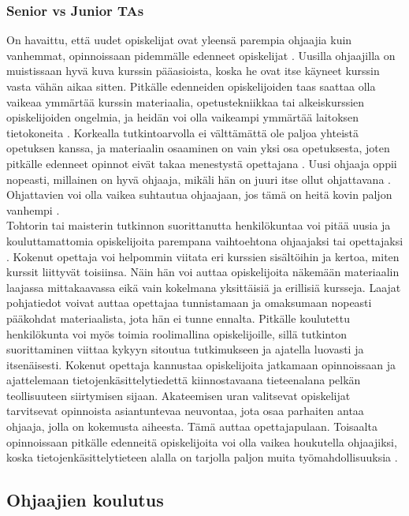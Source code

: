 \documentclass[finnish]{tktltiki2}
\theoremstyle{definition}
\theoremstyle{remark}
\begin{document}
\subsubsection{Senior vs Junior TAs}
On havaittu, että uudet opiskelijat ovat yleensä parempia ohjaajia kuin vanhemmat, opinnoissaan pidemmälle edenneet opiskelijat \cite{Dickson11}. Uusilla ohjaajilla on muistissaan hyvä kuva kurssin pääasioista, koska he ovat itse käyneet kurssin vasta vähän aikaa sitten. Pitkälle edenneiden opiskelijoiden taas saattaa olla vaikeaa ymmärtää kurssin materiaalia, opetustekniikkaa tai alkeiskurssien opiskelijoiden ongelmia, ja heidän voi olla vaikeampi ymmärtää laitoksen tietokoneita \cite{Reges88}. Korkealla tutkintoarvolla ei välttämättä ole paljoa yhteistä opetuksen kanssa, ja materiaalin osaaminen on vain yksi osa opetuksesta, joten pitkälle edenneet opinnot eivät takaa menestystä opettajana \cite{Baldwin00}. Uusi ohjaaja oppii nopeasti, millainen on hyvä ohjaaja, mikäli hän on juuri itse ollut ohjattavana \cite{Vihavainen, Vikberg}. Ohjattavien voi olla vaikea suhtautua ohjaajaan, jos tämä on heitä kovin paljon vanhempi \cite{Decker06}.
\\
Tohtorin tai maisterin tutkinnon suorittanutta henkilökuntaa voi pitää uusia ja kouluttamattomia opiskelijoita parempana vaihtoehtona ohjaajaksi tai opettajaksi \cite{Baldwin00}. Kokenut opettaja voi helpommin viitata eri kurssien sisältöihin ja kertoa, miten kurssit liittyvät toisiinsa. Näin hän voi auttaa opiskelijoita näkemään materiaalin laajassa mittakaavassa eikä vain kokelmana yksittäisiä ja erillisiä kursseja. Laajat pohjatiedot voivat auttaa opettajaa tunnistamaan ja omaksumaan nopeasti pääkohdat materiaalista, jota hän ei tunne ennalta. Pitkälle koulutettu henkilökunta voi myös toimia roolimallina opiskelijoille, sillä tutkinton suorittaminen viittaa kykyyn sitoutua tutkimukseen ja ajatella luovasti ja itsenäisesti. Kokenut opettaja kannustaa opiskelijoita jatkamaan opinnoissaan ja ajattelemaan tietojenkäsittelytiedettä kiinnostavaana tieteenalana pelkän teollisuuteen siirtymisen sijaan. Akateemisen uran valitsevat opiskelijat tarvitsevat opinnoista asiantuntevaa neuvontaa, jota osaa parhaiten antaa ohjaaja, jolla on kokemusta aiheesta. Tämä auttaa opettajapulaan. Toisaalta opinnoissaan pitkälle edenneitä opiskelijoita voi olla vaikea houkutella ohjaajiksi, koska tietojenkäsittelytieteen alalla on tarjolla paljon muita työmahdollisuuksia \cite{Kay98}. 


\subsection{Ohjaajien koulutus}
\end{document}
